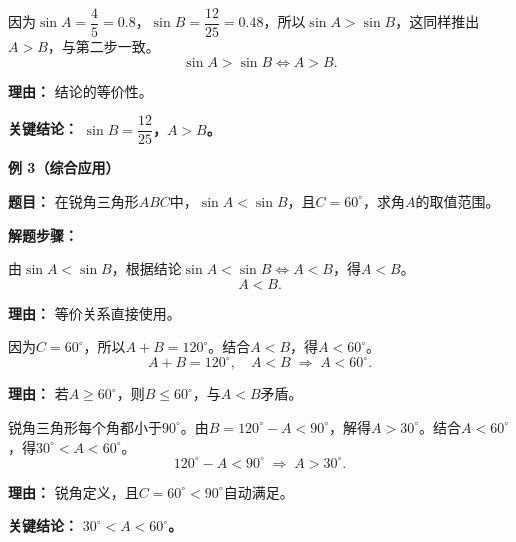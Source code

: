 \begin{examplebox}
\begin{description}[style=nextline, leftmargin=2.8em, labelsep=0.5em, itemsep=0.45em]
		\item[\textbf{第三步（正弦值验证）：}] 因为$\sin A=\dfrac{4}{5}=0.8$，$\sin B=\dfrac{12}{25}=0.48$，所以$\sin A>\sin B$，这同样推出$A>B$，与第二步一致。
			\[
				\sin A>\sin B\iff A>B.
			\]
			\par\textbf{理由：} 结论的等价性。
	\end{description}

	\textbf{\textcolor{CExample}{关键结论：}}
	\textbf{$\sin B=\dfrac{12}{25}$，$A>B$。}

	\medskip
	\textbf{\textcolor{CExample}{例 3（综合应用）}}

	\textbf{\textcolor{CExample}{题目：}}
	在锐角三角形$ABC$中，$\sin A<\sin B$，且$C=60^\circ$，求角$A$的取值范围。

	\textbf{\textcolor{CExample}{解题步骤：}}
	\begin{description}[style=nextline, leftmargin=2.8em, labelsep=0.5em, itemsep=0.45em]
		\item[\textbf{第一步（正弦反推角关系）：}] 由$\sin A<\sin B$，根据结论$\sin A<\sin B\iff A<B$，得$A<B$。
			\[
				A<B.
			\]
			\par\textbf{理由：} 等价关系直接使用。

		\item[\textbf{第二步（三角和与不等式）：}] 因为$C=60^\circ$，所以$A+B=120^\circ$。结合$A<B$，得$A<60^\circ$。
			\[
				A+B=120^\circ,\quad A<B\;\Longrightarrow\;A<60^\circ.
			\]
			\par\textbf{理由：} 若$A\ge60^\circ$，则$B\le60^\circ$，与$A<B$矛盾。

		\item[\textbf{第三步（锐角条件）：}] 锐角三角形每个角都小于$90^\circ$。由$B=120^\circ-A<90^\circ$，解得$A>30^\circ$。结合$A<60^\circ$，得$30^\circ<A<60^\circ$。
			\[
				120^\circ-A<90^\circ\;\Longrightarrow\;A>30^\circ.
			\]
			\par\textbf{理由：} 锐角定义，且$C=60^\circ<90^\circ$自动满足。
	\end{description}

	\textbf{\textcolor{CExample}{关键结论：}}
	\textbf{$30^\circ<A<60^\circ$。}
\end{examplebox}
